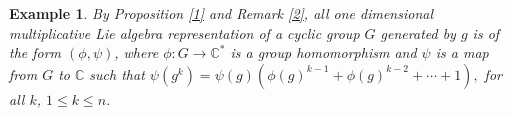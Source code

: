 \documentclass[10 pt,oneside,reqno,a4paper]{amsart}
\newtheorem{lemma}[theorem]{Lemma}
\newtheorem{example}[theorem]{Example}
\numberwithin{equation}{section}
\newcommand{\field}[1]{\mathbb{#1}}          \newcommand{\Q}{\field{Q}}
\newcommand{\C}{\field{C}}                   \newcommand{\A}{\field{A}}
\begin{document}
\begin{example}
  By Proposition \ref{1} and Remark \ref{2}, all one dimensional multiplicative Lie algebra representation of a cyclic group $G$ generated by $g$ is of the form $(\phi, \psi)$, where $\phi: G \to \C^*$ is a group homomorphism and $\psi$ is a map from $G$ to $\C$ such that $\psi(g^k)=\psi(g)(\phi(g)^{k-1}+ \phi(g)^{k-2}+ \cdots + 1),$ for all $k$, $1\leq k\leq n$.
\end{example}

    
\end{document}
